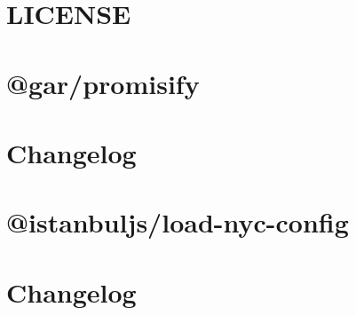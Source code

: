 \documentclass[twoside]{book}
\newcommand{\+}{\discretionary{\mbox{\scriptsize$\hookleftarrow$}}{}{}}
\begin{document}
\chapter{LICENSE}
\label{md__c___users_vaishnavi_jadhav__desktop__developer_code_mean_stack_example_client_node_modules__gar_promisify__l_i_c_e_n_s_e}

\chapter{@gar/promisify}
\label{md__c___users_vaishnavi_jadhav__desktop__developer_code_mean_stack_example_client_node_modules__gar_promisify__r_e_a_d_m_e}

\chapter{Changelog}
\label{md__c___users_vaishnavi_jadhav__desktop__developer_code_mean_stack_example_client_node_modules__ebe398674bebe7f6d3a579bc148d593a}

\chapter{@istanbuljs/load-\/nyc-\/config}
\label{md__c___users_vaishnavi_jadhav__desktop__developer_code_mean_stack_example_client_node_modules__35e36587a714749e12ebfa3f5b4ea1a6}

\chapter{Changelog}
\label{md__c___users_vaishnavi_jadhav__desktop__developer_code_mean_stack_example_client_node_modules__ce352bca13eb9f82cfd80cf89c81cb14}

\end{document}
